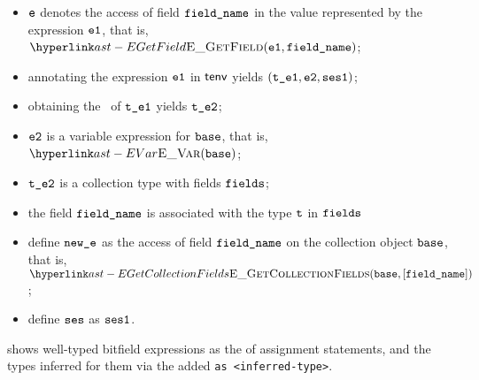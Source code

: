 \ProseParagraph
\AllApply
\begin{itemize}
  \item $\ve$ denotes the access of field $\fieldname$ in the value represented by the expression $\veone$, that is, $\EGetField(\veone, \fieldname)$;
  \item annotating the expression $\veone$ in $\tenv$ yields $(\vteone, \vetwo, \vsesone)$\ProseOrTypeError;
  \item obtaining the \underlyingtype\ of $\vteone$ yields $\vtetwo$\ProseOrTypeError;
  \item $\vetwo$ is a variable expression for $\vbase$, that is, $\EVar(\vbase)$;
  \item $\vtetwo$ is a collection type with fields $\fields$;
  \item the field $\fieldname$ is associated with the type $\vt$ in $\fields$
  \item define $\newe$ as the access of field $\fieldname$ on the collection object $\vbase$, that is, $\EGetCollectionFields(\vbase, [\fieldname])$;
  \item define $\vses$ as $\vsesone$.
\end{itemize}

\FormallyParagraph
\begin{mathpar}
\end{mathpar}


 shows well-typed bitfield expressions
as the \rhsexpressions{} of assignment statements,
and the types inferred for them via the added \verb|as <inferred-type>|.

